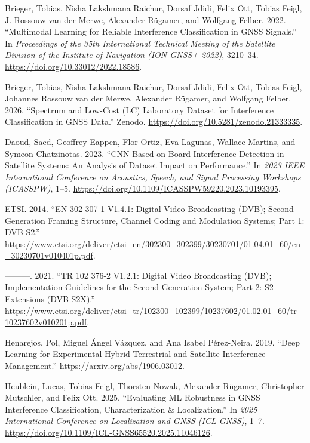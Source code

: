 \documentclass[
  10pt,
]{article}
\newlength{\cslhangindent}
\newenvironment{CSLReferences}[2] %
 {\begin{list}{}{%
  \setlength{\itemindent}{0pt}
  \setlength{\leftmargin}{0pt}
  \setlength{\parsep}{0pt}
  \ifodd #1
   \setlength{\leftmargin}{\cslhangindent}
   \setlength{\itemindent}{-1\cslhangindent}
  \fi
  \setlength{\itemsep}{#2\baselineskip}}}
 {\end{list}}
\begin{document}
\label{refs}
\begin{CSLReferences}{1}{0}
Brieger, Tobias, Nisha Lakshmana Raichur, Dorsaf Jdidi, Felix Ott,
Tobias Feigl, J. Rossouw van der Merwe, Alexander Rügamer, and Wolfgang
Felber. 2022. {``Multimodal Learning for Reliable Interference
Classification in {GNSS} Signals.''} In \emph{Proceedings of the 35th
International Technical Meeting of the Satellite Division of the
Institute of Navigation (ION GNSS+ 2022)}, 3210--34.
\url{https://doi.org/10.33012/2022.18586}.

Brieger, Tobias, Nisha Lakshmana Raichur, Dorsaf Jdidi, Felix Ott,
Tobias Feigl, Johannes Rossouw van der Merwe, Alexander Rügamer, and
Wolfgang Felber. 2026. {``Spectrum and Low-Cost ({LC}) Laboratory
Dataset for Interference Classification in {GNSS} Data.''} Zenodo.
\url{https://doi.org/10.5281/zenodo.21333335}.

Daoud, Saed, Geoffrey Eappen, Flor Ortiz, Eva Lagunas, Wallace Martins,
and Symeon Chatzinotas. 2023. {``{CNN}-Based on-Board Interference
Detection in Satellite Systems: An Analysis of Dataset Impact on
Performance.''} In \emph{2023 IEEE International Conference on
Acoustics, Speech, and Signal Processing Workshops (ICASSPW)}, 1--5.
\url{https://doi.org/10.1109/ICASSPW59220.2023.10193395}.

ETSI. 2014. {``{EN 302 307-1 V1.4.1}: Digital Video Broadcasting
({DVB}); Second Generation Framing Structure, Channel Coding and
Modulation Systems; Part 1: {DVB-S2}.''}
\url{https://www.etsi.org/deliver/etsi_en/302300_302399/30230701/01.04.01_60/en_30230701v010401p.pdf}.

---------. 2021. {``{TR 102 376-2 V1.2.1}: Digital Video Broadcasting
({DVB}); Implementation Guidelines for the Second Generation System;
Part 2: {S2} Extensions ({DVB-S2X}).''}
\url{https://www.etsi.org/deliver/etsi_tr/102300_102399/10237602/01.02.01_60/tr_10237602v010201p.pdf}.

Henarejos, Pol, Miguel Ángel Vázquez, and Ana Isabel Pérez-Neira. 2019.
{``Deep Learning for Experimental Hybrid Terrestrial and Satellite
Interference Management.''} \url{https://arxiv.org/abs/1906.03012}.

Heublein, Lucas, Tobias Feigl, Thorsten Nowak, Alexander Rügamer,
Christopher Mutschler, and Felix Ott. 2025. {``Evaluating {ML}
Robustness in {GNSS} Interference Classification, Characterization \&
Localization.''} In \emph{2025 International Conference on Localization
and GNSS (ICL-GNSS)}, 1--7.
\url{https://doi.org/10.1109/ICL-GNSS65520.2025.11046126}.


\end{CSLReferences}
\end{document}
